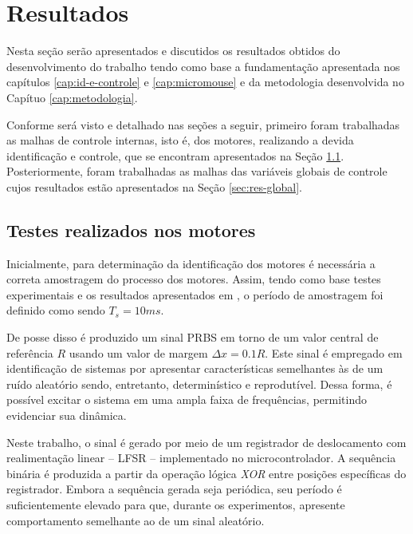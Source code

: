 \chapter{Resultados} \label{cap:resultados}

    Nesta seção serão apresentados e discutidos os resultados obtidos do desenvolvimento do trabalho tendo como base a fundamentação apresentada nos capítulos \ref{cap:id-e-controle} e \ref{cap:micromouse} e da metodologia desenvolvida no Capítuo \ref{cap:metodologia}. 
    
    Conforme será visto e detalhado nas seções a seguir, primeiro foram trabalhadas as malhas de controle internas, isto é, dos motores, realizando a devida identificação e controle, que se encontram apresentados na Seção \ref{sec:res-motores}. Posteriormente, foram trabalhadas as malhas das variáveis globais de controle cujos resultados estão apresentados na Seção \ref{sec:res-global}.

    \section{Testes realizados nos motores} \label{sec:res-motores}
        
        Inicialmente, para determinação da identificação dos motores é necessária a correta amostragem do processo dos motores. Assim, tendo como base testes experimentais e os resultados apresentados em , o período de amostragem foi definido como sendo $T_s = 10ms$.

        De posse disso é produzido um sinal \gls{PRBS} em torno de um valor central de referência $R$ usando um valor de margem $\varDelta x = 0.1R$. Este sinal é empregado em identificação de sistemas por apresentar características semelhantes às de um ruído aleatório sendo, entretanto, determinístico e reprodutível. Dessa forma, é possível excitar o sistema em uma ampla faixa de frequências, permitindo evidenciar sua dinâmica.
        

        Neste trabalho, o sinal é gerado por meio de um registrador de deslocamento com realimentação linear -- \gls{LFSR} -- implementado no microcontrolador. A sequência binária é produzida a partir da operação lógica \textit{XOR} entre posições específicas do registrador. Embora a sequência gerada seja periódica, seu período é suficientemente elevado para que, durante os experimentos, apresente comportamento semelhante ao de um sinal aleatório.

